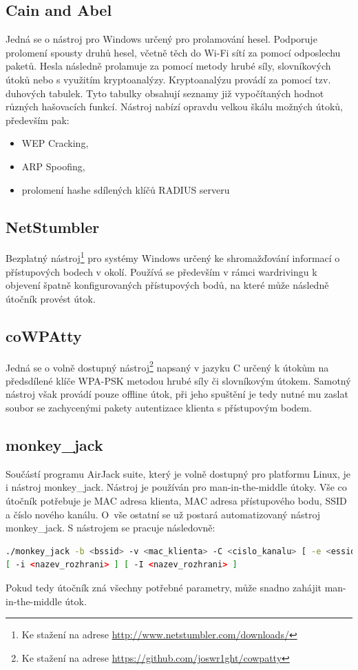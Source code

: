 \subsection{Cain and Abel}
Jedná se o nástroj pro Windows určený pro prolamování hesel. Podporuje prolomení spousty druhů hesel, včetně těch do Wi-Fi sítí za pomocí odposlechu paketů. Hesla následně prolamuje za pomocí metody hrubé síly, slovníkových útoků nebo s využitím kryptoanalýzy. Kryptoanalýzu provádí za pomocí tzv. duhových tabulek. Tyto tabulky obsahují seznamy již vypočítaných hodnot různých hašovacích funkcí. Nástroj nabízí opravdu velkou škálu možných útoků, především pak:
\begin{itemize}
  \item{WEP Cracking,}
  \item{ARP Spoofing,}
  \item{prolomení hashe sdílených klíčů RADIUS serveru}
\end{itemize}

\subsection{NetStumbler}
Bezplatný nástroj\footnote{Ke stažení na adrese \url{http://www.netstumbler.com/downloads/}} pro systémy Windows určený ke shromažďování informací o přístupových bodech v okolí. Používá se především v rámci wardrivingu k objevení špatně konfigurovaných přístupových bodů, na které může následně útočník provést útok. 

\subsection{coWPAtty}
Jedná se o volně dostupný nástroj\footnote{Ke stažení na adrese \url{https://github.com/joswr1ght/cowpatty}} napsaný v jazyku C určený k útokům na předsdílené klíče WPA-PSK metodou hrubé síly či slovníkovým útokem. Samotný nástroj však provádí pouze offline útok, při jeho spuštění je tedy nutné mu zaslat soubor se zachycenými pakety autentizace klienta s přístupovým bodem. 

\subsection{monkey\_jack}
Součástí programu AirJack suite, který je volně dostupný pro platformu Linux, je i nástroj monkey\_jack. Nástroj je používán pro man-in-the-middle útoky. Vše co útočník potřebuje je MAC adresa klienta, MAC adresa přístupového bodu, SSID a číslo nového kanálu. O~vše ostatní se už postará automatizovaný nástroj monkey\_jack. S nástrojem se pracuje následovně:
\begin{lstlisting}[language=bash]
./monkey_jack -b <bssid> -v <mac_klienta> -C <cislo_kanalu> [ -e <essid> ]
[ -i <nazev_rozhrani> ] [ -I <nazev_rozhrani> ]
\end{lstlisting}
Pokud tedy útočník zná všechny potřebné parametry, může snadno zahájit man-in-the-middle útok.

